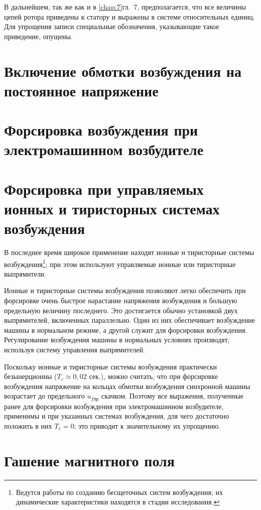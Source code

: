 В дальнейшем, так же как и в \ref{chap:7}{гл.~7}, предполагается, что все величины цепей ротора приведены к статору и выражены в системе относительных единиц. Для упрощения записи специальные обозначения, указывающие такое приведение, опущены.

\section{Включение обмотки возбуждения на постоянное напряжение}
\label{sec:8-2}


\section{Форсировка возбуждения при электромашинном возбудителе}
\label{sec:8-3}


\section{Форсировка при управляемых ионных и тиристорных системах возбуждения}
\label{sec:8-4}

В последнее время широкое применение находят ионные и тиристорные системы возбуждения\footnote{Ведутся работы по созданию бесщеточных систем возбуждения; их динамические характеристики находятся в стадии исследования.}; при этом используют управляемые ионные или тиристорные выпрямители.

Ионные и тиристорные системы возбуждения позволяют легко обеспечить при форсировке очень быстрое нарастание напряжения возбуждения и большую предельную величину последнего. Это достигается обычно установкой двух выпрямителей, включенных параллельно. Один из них обеспечивает возбуждение машины в нормальном режиме, а другой служит для форсировки возбуждения. Регулирование возбуждения машины в нормальных условиях производят, используя систему управления выпрямителей.

Поскольку ионные и тиристорные системы возбуждения практически безынерционны ($ T_e \approx 0,02\text{~сек.} $), можно считать, что при форсировке возбуждения напряжение на кольцах обмотки возбуждения синхронной машины возрастает до предельного $ u_{f\text{пр}} $ скачком. Поэтому все выражения, полученные ранее для форсировки возбуждения при электромашинном возбудителе, применимы и при указанных системах возбуждения, для чего достаточно положить в них $ T_e = 0 $; это приводит к значительному их упрощению.

\section{Гашение магнитного поля}
\label{sec:8-5}